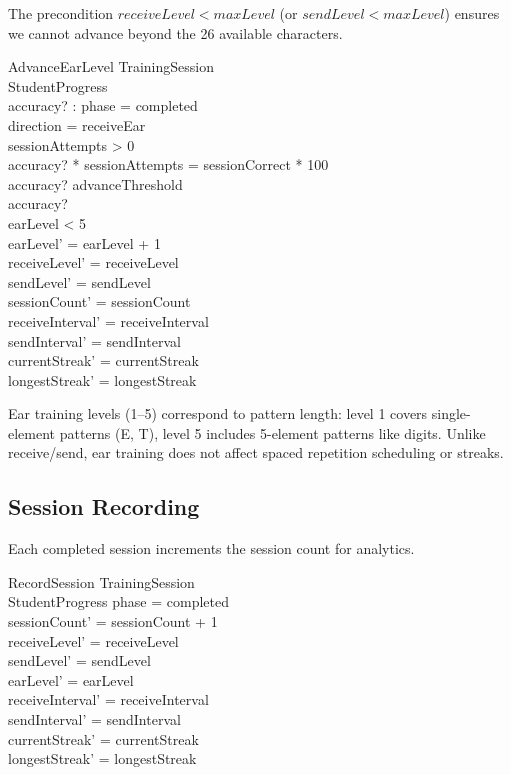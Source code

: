 \documentclass[a4paper,10pt,fleqn]{article}
\begin{document}
The precondition $receiveLevel < maxLevel$ (or $sendLevel < maxLevel$) ensures
we cannot advance beyond the 26 available characters.

\begin{schema}{AdvanceEarLevel}
\Xi TrainingSession \\
\Delta StudentProgress \\
accuracy? : \nat
\where
phase = completed \\
direction = receiveEar \\
sessionAttempts > 0 \\
accuracy? * sessionAttempts = sessionCorrect * 100 \\
accuracy? \geq advanceThreshold \\
accuracy?  \\
earLevel < 5 \\
earLevel' = earLevel + 1 \\
receiveLevel' = receiveLevel \\
sendLevel' = sendLevel \\
sessionCount' = sessionCount \\
receiveInterval' = receiveInterval \\
sendInterval' = sendInterval \\
currentStreak' = currentStreak \\
longestStreak' = longestStreak
\end{schema}

Ear training levels (1--5) correspond to pattern length: level 1 covers single-element
patterns (E, T), level 5 includes 5-element patterns like digits. Unlike receive/send,
ear training does not affect spaced repetition scheduling or streaks.

\subsection{Session Recording}

Each completed session increments the session count for analytics.

\begin{schema}{RecordSession}
\Xi TrainingSession \\
\Delta StudentProgress
\where
phase = completed \\
sessionCount' = sessionCount + 1 \\
receiveLevel' = receiveLevel \\
sendLevel' = sendLevel \\
earLevel' = earLevel \\
receiveInterval' = receiveInterval \\
sendInterval' = sendInterval \\
currentStreak' = currentStreak \\
longestStreak' = longestStreak
\end{schema}
\end{document}

